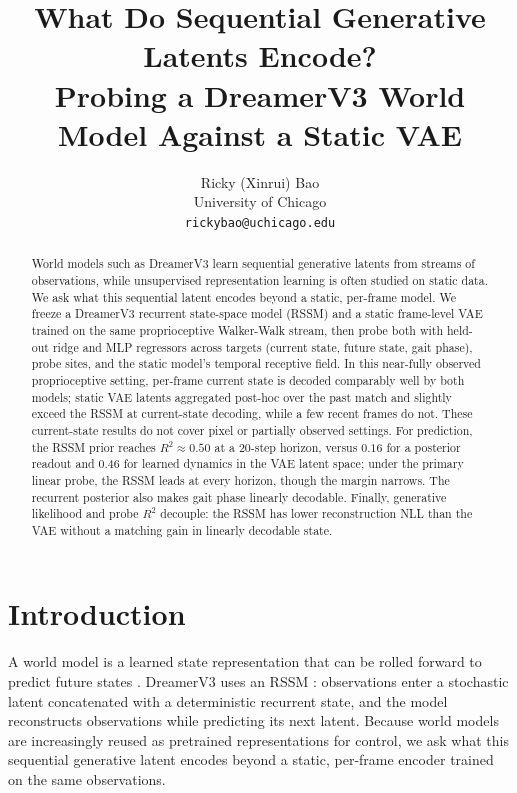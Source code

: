 \documentclass{article} %
\title{What Do Sequential Generative Latents Encode?\\
Probing a DreamerV3 World Model Against a Static VAE}
\author{Ricky (Xinrui) Bao \\
University of Chicago \\
\texttt{rickybao@uchicago.edu}}
\newcommand{\rtwo}{\ensuremath{R^2}}
\begin{document}
\maketitle
\lhead{}
\renewcommand{\headrulewidth}{0pt}

\begin{abstract}
World models such as DreamerV3 learn sequential generative latents from streams
of observations, while unsupervised representation learning is often studied on
static data. We ask what this sequential latent encodes beyond a static,
per-frame model. We freeze a DreamerV3 recurrent state-space model (RSSM) and a
static frame-level VAE trained on the same proprioceptive Walker-Walk stream,
then probe both with held-out ridge and MLP regressors across targets (current
state, future state, gait phase), probe sites, and the static model's temporal
receptive field. In this near-fully observed proprioceptive setting, per-frame
current state is decoded comparably well by both models; static VAE latents
aggregated post-hoc over the past match and slightly exceed the RSSM at
current-state decoding, while a few recent frames do not. These current-state
results do not cover pixel or partially observed settings. For prediction, the
RSSM prior reaches $R^2\approx0.50$ at a 20-step horizon, versus $0.16$ for a
posterior readout and $0.46$ for learned dynamics in the VAE latent space; under
the primary linear probe, the RSSM leads at every horizon, though the margin
narrows. The recurrent posterior also makes gait phase linearly decodable.
Finally, generative likelihood and probe \rtwo{} decouple: the RSSM has lower
reconstruction NLL than the VAE without a matching gain in linearly decodable
state.
\end{abstract}

\section{Introduction}

A world model is a learned state representation that can be rolled forward to
predict future states \citep{ha2018worldmodels}. DreamerV3
\citep{hafner2025dreamerv3} uses an RSSM \citep{hafner2019planet}: observations
enter a stochastic latent concatenated with a deterministic recurrent state, and
the model reconstructs observations while predicting its next latent. Because
world models are increasingly reused as pretrained representations for control,
we ask what this sequential generative latent encodes beyond a static,
per-frame encoder trained on the same observations.
\end{document}

